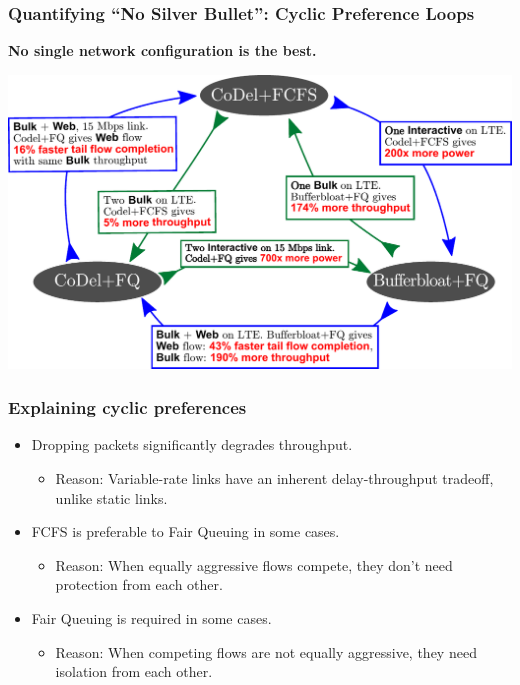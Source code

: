 \begin{frame}[plain]
\frametitle{Quantifying ``No Silver Bullet'': Cyclic Preference Loops}
\textbf{No single network configuration is the best.} \\
\begin{center}
\includegraphics[width=\columnwidth]{fig.pdf}
\end{center}
\end{frame}

\begin{frame}[plain]
\frametitle{Explaining cyclic preferences}
\begin{itemize}
\item Dropping packets significantly degrades throughput.
      \begin{itemize}
      \item Reason: Variable-rate links have an inherent delay-throughput tradeoff, unlike static links.
      \end{itemize} 
 
\item FCFS is preferable to Fair Queuing in some cases.
      \begin{itemize}
      \item Reason: When equally aggressive flows compete, they don't need protection from each other.
      \end{itemize}

\item Fair Queuing is required in some cases.
      \begin{itemize}      
      \item Reason: When competing flows are not equally aggressive, they need isolation from each other.
      \end{itemize}
\end{itemize}
\end{frame}

